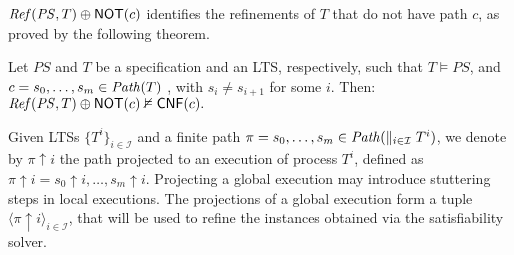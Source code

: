$\mathit{Ref}(\mathit{PS},T) \oplus \mathsf{NOT}(c)$ identifies the refinements of $T$ that do not have path $c$, as proved by the following theorem.

\begin{theorem}\label{theorem:cex-entails} Let $\mathit{PS}$ and $T$ be a specification and an LTS, respectively, such that $T \vDash \mathit{PS}$, and $c = s_0,\dots, s_m \in \mathit{Path}(T)$ , with $s_i \neq s_{i+1}$ for some $i$. Then:
$
	\mathit{Ref}(\mathit{PS},T) \oplus \mathsf{NOT}(c)  \nvDash \mathsf{CNF}(c).
$
\end{theorem}
	
Given LTSs $\{ T^i \}_{i \in \mathcal{I}}$ and a finite path $\pi = s_0, \dots, s_m \in \mathit{Path}(\parallel_{i \in \mathcal{I}} T^i)$, we denote by $\pi {\uparrow} i$ the path projected to an execution of process $T^i$, defined as  $\pi {\uparrow} i = s_0 {\uparrow} i, \dots, s_m {\uparrow} i$. Projecting a global execution may introduce stuttering steps in local executions. The projections of a global execution form a tuple  $\langle \pi{\uparrow}i \rangle_{i \in \mathcal{I}}$, that will be used to refine the instances obtained via the satisfiability solver. 

